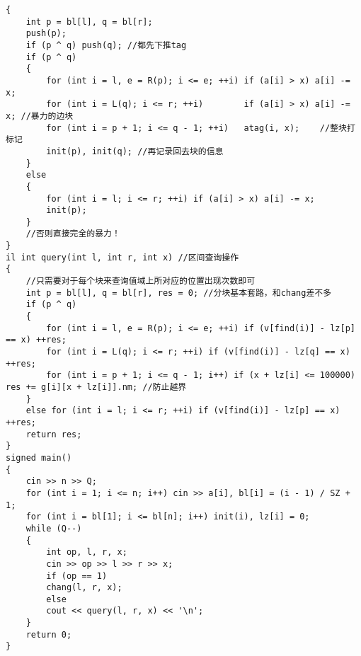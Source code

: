 \documentclass[E:/GsjzTle/main/main.tex]{subfiles}
\begin{document}
\begin{lstlisting}
{
	int p = bl[l], q = bl[r];
	push(p);
	if (p ^ q) push(q); //都先下推tag
	if (p ^ q)
	{
		for (int i = l, e = R(p); i <= e; ++i) if (a[i] > x) a[i] -= x;
		for (int i = L(q); i <= r; ++i) 	   if (a[i] > x) a[i] -= x; //暴力的边块
		for (int i = p + 1; i <= q - 1; ++i)   atag(i, x);	  //整块打标记
		init(p), init(q); //再记录回去块的信息
	}
	else
	{
		for (int i = l; i <= r; ++i) if (a[i] > x) a[i] -= x;
		init(p);
	}
	//否则直接完全的暴力！
}
il int query(int l, int r, int x) //区间查询操作
{
	//只需要对于每个块来查询值域上所对应的位置出现次数即可
	int p = bl[l], q = bl[r], res = 0; //分块基本套路，和chang差不多
	if (p ^ q)
	{
		for (int i = l, e = R(p); i <= e; ++i) if (v[find(i)] - lz[p] == x) ++res;
		for (int i = L(q); i <= r; ++i) if (v[find(i)] - lz[q] == x) ++res;
		for (int i = p + 1; i <= q - 1; i++) if (x + lz[i] <= 100000) res += g[i][x + lz[i]].nm; //防止越界
	}
	else for (int i = l; i <= r; ++i) if (v[find(i)] - lz[p] == x) ++res;
	return res;
}
signed main()
{
	cin >> n >> Q;
	for (int i = 1; i <= n; i++) cin >> a[i], bl[i] = (i - 1) / SZ + 1;
	for (int i = bl[1]; i <= bl[n]; i++) init(i), lz[i] = 0;
	while (Q--)
	{
		int op, l, r, x;
		cin >> op >> l >> r >> x;
		if (op == 1)
		chang(l, r, x);
		else
		cout << query(l, r, x) << '\n';
	}
	return 0;
}
\end{lstlisting}
\end{document}
